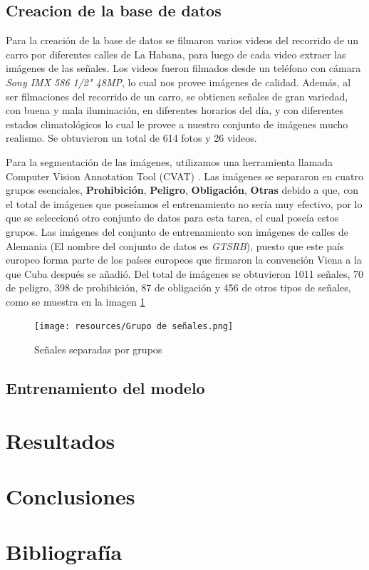 \documentclass{article}
\begin{document}
\subsection{Creacion de la base de datos}
Para la creación de la base de datos se filmaron varios videos del recorrido de un carro por diferentes calles de La Habana, para luego de cada video extraer las imágenes de las señales. Los videos fueron filmados desde un teléfono con cámara \textit{Sony IMX 586 1/2" 48MP}, lo cual nos provee imágenes de calidad. Además, al ser filmaciones del recorrido de un carro, se obtienen señales de gran variedad, con buena y mala iluminación, en diferentes horarios del día, y con diferentes estados climatológicos lo cual le provee a nuestro conjunto de imágenes mucho realismo. Se obtuvieron un total de 614 fotos y 26 videos.


Para la segmentación de las imágenes, utilizamos una herramienta llamada Computer Vision Annotation Tool (CVAT) \cite{ref10}. Las imágenes se separaron en cuatro grupos esenciales, \textbf{Prohibición}, \textbf{Peligro}, \textbf{Obligación}, \textbf{Otras} debido a que, con el total de imágenes que poseíamos el entrenamiento no sería muy efectivo, por lo que se seleccionó otro conjunto de datos para esta tarea, el cual poseía estos grupos. Las imágenes del conjunto de entrenamiento son imágenes de calles de Alemania (El nombre del conjunto de datos es \textit{GTSRB}), puesto que este país europeo forma parte de los países europeos que firmaron la convención Viena a la que Cuba después se añadió. Del total de imágenes se obtuvieron 1011 señales, 70 de peligro, 398 de prohibición, 87 de obligación y 456 de otros tipos de señales, como se muestra en la imagen \ref{fig:Grupos}
\begin{figure}[h]
\centering
\texttt{[image: resources/Grupo de señales.png]}
\caption{Señales separadas por grupos}
\label{fig:Grupos}
\end{figure}

\subsection{Entrenamiento del modelo}


\section{Resultados}
\lipsum[1-4]
\section{Conclusiones}
\lipsum[1-4]
\section{Bibliografía}

 
\end{document}
